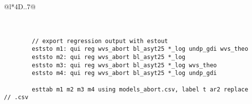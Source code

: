 {\begin{table}[htp]
{\begin{tabular}{@{}l*{4}{D{.}{.}{7}}@{}}
		\hline\hline
		\\
		\\
		\\
	\end{tabular}
	}
 	\caption[Regression output produced with .]{\label{tbl:estout_reg}
	Regression output produced with . Stata command shown at p.~\pageref{tbl:hibbs_yx1_estout}.}
	\end{table}%
	\renewcommand\arraystretch{1}
	\begin{verbatim}
		// export regression output with estout
		eststo m1: qui reg wvs_abort bl_asyt25 *_log undp_gdi wvs_theo
		eststo m2: qui reg wvs_abort bl_asyt25 *_log
		eststo m3: qui reg wvs_abort bl_asyt25 *_log wvs_theo
		eststo m4: qui reg wvs_abort bl_asyt25 *_log undp_gdi

		esttab m1 m2 m3 m4 using models_abort.csv, label t ar2 replace // .csv
	\end{verbatim}
}
